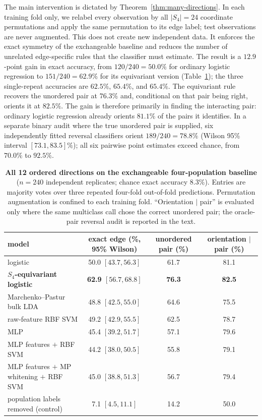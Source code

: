\documentclass[11pt]{article}
\theoremstyle{plain}
\theoremstyle{definition}
\theoremstyle{remark}
\begin{document}
The main intervention is dictated by Theorem~\ref{thm:many-directions}. In each training fold
only, we relabel every observation by all $|S_4|=24$ coordinate permutations and apply the same
permutation to its edge label; test observations are never augmented. This does not create new
independent data. It enforces the exact symmetry of the exchangeable baseline and reduces the
number of unrelated edge-specific rules that the classifier must estimate. The result is a
$12.9$-point gain in exact accuracy, from $120/240=50.0\%$ for ordinary logistic regression to
$151/240=62.9\%$ for its equivariant version (Table~\ref{tab:twelve-direction-models}); the three
single-repeat accuracies are $62.5\%$, $65.4\%$, and $65.4\%$. The equivariant rule recovers the
unordered pair at $76.3\%$ and, conditional on that pair being right, orients it at $82.5\%$.
The gain is therefore primarily in finding the interacting pair: ordinary logistic regression
already orients $81.1\%$ of the pairs it identifies. In a separate binary audit where the true
unordered pair is supplied, six independently fitted reversal classifiers orient $189/240=78.8\%$
(Wilson 95\% interval $[73.1,83.5]\%$); all six pairwise point estimates exceed chance, from
$70.0\%$ to $92.5\%$.

\begin{table}[H]
\centering
\scriptsize
\begin{tabular}{lccc}
\toprule
model & exact edge (\%, 95\% Wilson) & unordered pair (\%) & orientation $\mid$ pair (\%) \\
\midrule
logistic & 50.0 $[43.7,56.3]$ & 61.7 & 81.1 \\
\textbf{$S_4$-equivariant logistic} & \textbf{62.9 $[56.7,68.8]$} & \textbf{76.3} & \textbf{82.5} \\
Marchenko--Pastur bulk LDA & 48.8 $[42.5,55.0]$ & 64.6 & 75.5 \\
raw-feature RBF SVM & 49.2 $[42.9,55.5]$ & 62.5 & 78.7 \\
MLP & 45.4 $[39.2,51.7]$ & 57.1 & 79.6 \\
MLP features $+$ RBF SVM & 44.2 $[38.0,50.5]$ & 55.8 & 79.1 \\
MLP features $+$ MP whitening $+$ RBF SVM & 45.0 $[38.8,51.3]$ & 56.7 & 79.4 \\
population labels removed (control) & 7.1 $[4.5,11.1]$ & 14.2 & 50.0 \\
\bottomrule
\end{tabular}
\caption{\textbf{All 12 ordered directions on the exchangeable four-population baseline}
($n=240$ independent replicates; chance exact accuracy $8.3\%$). Entries are majority votes over
three repeated four-fold out-of-fold predictions. Permutation augmentation is confined to each
training fold. ``Orientation $\mid$ pair'' is evaluated only where the same multiclass call chose
the correct unordered pair; the oracle-pair reversal audit is reported in the text.}
\label{tab:twelve-direction-models}
\end{table}
\end{document}
